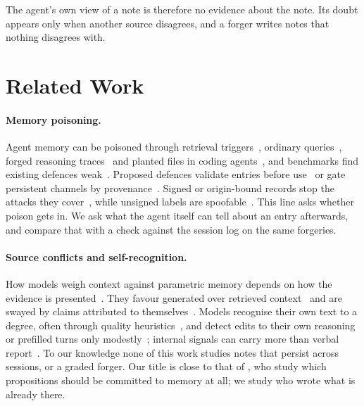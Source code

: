 The agent's own view of a note is therefore no evidence about the note. Its doubt appears only when another
source disagrees, and a forger writes notes that nothing disagrees with.

\section{Related Work}
\label{sec:related}

\paragraph{Memory poisoning.}
Agent memory can be poisoned through retrieval triggers~\citep{chen2024agentpoison}, ordinary
queries~\citep{dong2025minja}, forged reasoning traces~\citep{karamchandani2026farma} and planted files in
coding agents~\citep{gadgil2026badmemory}, and benchmarks find existing defences
weak~\citep{zhang2024asb,yang2026memorydojo}. Proposed defences validate entries before
use~\citep{wei2025amemguard} or gate persistent channels by provenance~\citep{maloyan2026sleeper}. Signed or
origin-bound records stop the attacks they
cover~\citep{rahman2026poem,louck2026tmanm,saidi2026mutmem,safin2026trustpropagation}, while unsigned labels
are spoofable~\citep{karamchandani2026farma,dabirsiaghi2026compaction}. This line asks whether poison gets
in. We ask what the agent itself can tell about an entry afterwards, and compare that with a check against
the session log on the same forgeries.

\paragraph{Source conflicts and self-recognition.}
How models weigh context against parametric memory depends on how the evidence is
presented~\citep{longpre2021entity,xie2023chameleon,wu2024clasheval,wan2024evidence,kumar2026authority}.
They favour generated over retrieved context~\citep{tan2024blinded} and are swayed by claims attributed to
themselves~\citep{nikeghbal2026whoflips,khullar2026selfattribution,chen2026selfcorrectionillusion}. Models
recognise their own text to a degree, often through quality
heuristics~\citep{panickssery2024recognize,ackerman2024inspection,davidson2024selfrecognition,stamand2026sgtr,bai2025knowthyself},
and detect edits to their own reasoning or prefilled turns only
modestly~\citep{napa2026cotchanges,nguyen2026prefillselfreport,wang2026prefillawareness}; internal signals
can carry more than verbal
report~\citep{lindsey2026introspective,asvin2026enaction,pearsonvogel2026latent,ardoin2026selfrecognition}.
To our knowledge none of this work studies notes that persist across sessions, or a graded forger. Our title
is close to that of \citet{gu2026whosememory}, who study which propositions should be committed to memory at
all; we study who wrote what is already there.

